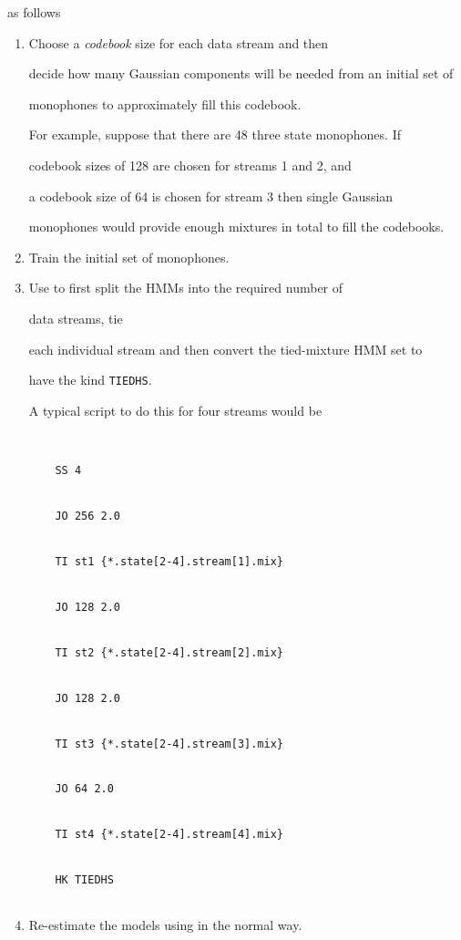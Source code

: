 as follows


\begin{enumerate}


\item Choose a {\it codebook} size for each data stream and then 


   decide how many Gaussian components will be needed from an initial set of


    monophones to approximately fill this codebook.


    For example, suppose that there are 48 three state monophones.  If


    codebook sizes of 128 are chosen for streams 1 and 2, and


    a codebook size of 64 is chosen for stream 3 then single Gaussian


    monophones would provide enough mixtures in total to fill the codebooks.


\item Train the initial set of monophones.


\item Use  to first split the HMMs into the required number of


    data streams, tie


    each individual stream and then convert the tied-mixture HMM set to 


    have the kind \texttt{TIEDHS}.  


    A typical script to do this for four streams would be


\begin{verbatim}


    SS 4


    JO 256 2.0


    TI st1 {*.state[2-4].stream[1].mix}


    JO 128 2.0


    TI st2 {*.state[2-4].stream[2].mix}


    JO 128 2.0


    TI st3 {*.state[2-4].stream[3].mix}


    JO 64 2.0


    TI st4 {*.state[2-4].stream[4].mix}


    HK TIEDHS


\end{verbatim}


\item Re-estimate the models using  in the normal way.


\end{enumerate}


